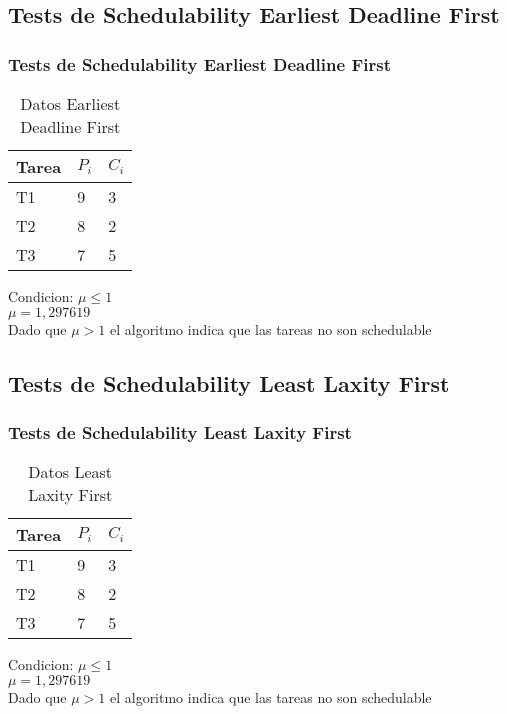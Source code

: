 \documentclass[xcolor=table]{beamer}
\begin{document}
\subsection{Tests de Schedulability  Earliest Deadline First } 

\begin{frame} 
\frametitle{Tests de Schedulability  Earliest Deadline First } 
\begin{table} 
\centering 
\begin{tabular}{|l|l|l|} 
\hline 
\cellcolor{lightgray}Tarea & \cellcolor{lightgray}$P_i$ & \cellcolor{lightgray}$C_i$ \\ \hline 
T1   & 9  &  3\\ \hline 
T2   & 8  &  2\\ \hline 
T3   & 7  &  5\\ \hline 
\end{tabular} 
\caption{Datos  Earliest Deadline First } 
\end{table} 
Condicion: $\mu \leq 1$ \\ 
$\mu =  1,297619 $ \\ 
Dado que $\mu>1$ el algoritmo indica que las tareas no son schedulable \\ 
\end{frame} 

\subsection{Tests de Schedulability  Least Laxity First } 

\begin{frame} 
\frametitle{Tests de Schedulability  Least Laxity First } 
\begin{table} 
\centering 
\begin{tabular}{|l|l|l|} 
\hline 
\cellcolor{lightgray}Tarea & \cellcolor{lightgray}$P_i$ & \cellcolor{lightgray}$C_i$ \\ \hline 
T1   & 9  &  3\\ \hline 
T2   & 8  &  2\\ \hline 
T3   & 7  &  5\\ \hline 
\end{tabular} 
\caption{Datos  Least Laxity First } 
\end{table} 
Condicion: $\mu \leq 1$ \\ 
$\mu =  1,297619 $ \\ 
Dado que $\mu>1$ el algoritmo indica que las tareas no son schedulable \\ 
\end{frame} 
\end{document}
